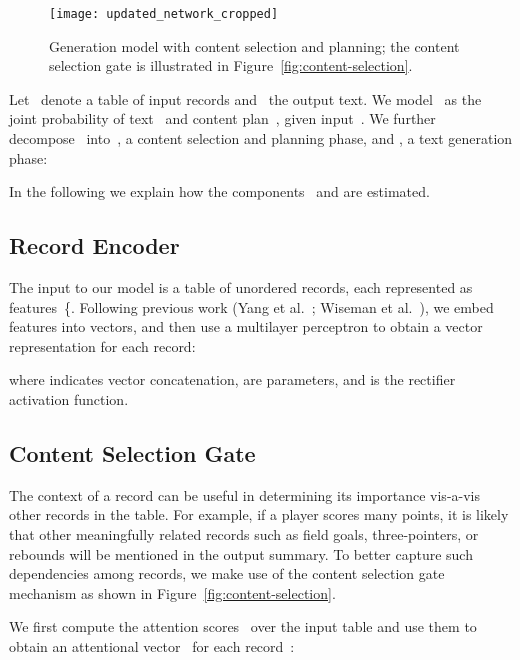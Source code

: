 \documentclass[letterpaper]{article} \usepackage{aaai19}  \usepackage{times}  \usepackage{helvet}  \usepackage{courier}  \usepackage{url}  \usepackage{graphicx}  \frenchspacing  \setlength{\pdfpagewidth}{8.5in}  \setlength{\pdfpageheight}{11in}  \graphicspath{ {images/} }
\begin{document}
\begin{figure}[t]
\begin{center}
\texttt{[image: updated\_network\_cropped]}
\end{center}
\caption{Generation model with content selection and planning;
  the content selection gate is illustrated in
  Figure~\ref{fig:content-selection}.} 
\label{fig:overall-method}
\end{figure}





Let~ denote a table of input records and~
the output text. We model~ as the joint probability of
text~ and content plan~, given input~. We further
decompose~ into~, a content selection and planning
phase, and , a text generation phase:

In the following we explain how the components~ and 
are estimated.


\subsection{Record Encoder}
\label{sec:record-encoder}

The input to our model is a table of unordered records, each
represented as features~\{. Following previous
work (Yang et al.~\citeyear{D17-1197}; Wiseman et
al.~\citeyear{wiseman2017challenges}), we embed features into vectors,
and then use a multilayer perceptron to obtain a vector representation
 for each record:

where  indicates vector concatenation,  are parameters, and  is the rectifier activation function.





\subsection{Content Selection Gate}
\label{content-selection-gate}
The context of a record can be useful in determining its importance
vis-a-vis other records in the table. For example, if a player scores
many points, it is likely that other meaningfully related records such
as field goals, three-pointers, or rebounds will be mentioned in the
output summary. To better capture such dependencies among records, we
make use of the content selection gate mechanism as shown in
Figure~\ref{fig:content-selection}.


We first compute the attention scores~ over the
input table and use them to obtain an attentional vector ~for each record~:
\end{document}

